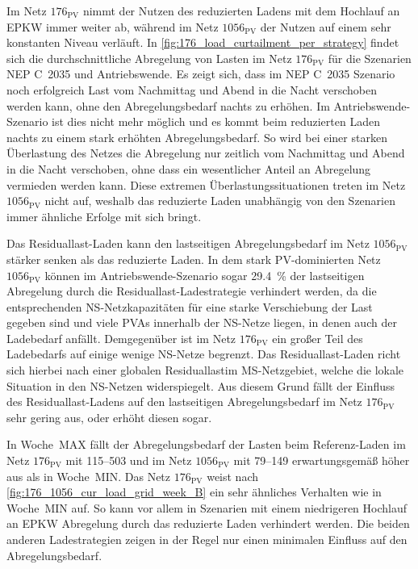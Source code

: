 

Im Netz \(176_{\text{PV}}\) nimmt der Nutzen des reduzierten Ladens mit dem Hochlauf an \gls{EPKW} immer weiter ab, während im Netz \(1056_{\text{PV}}\) der Nutzen auf einem sehr konstanten Niveau verläuft.
In \autoref{fig:176_load_curtailment_per_strategy} findet sich die durchschnittliche Abregelung von Lasten im Netz \(176_{\text{PV}}\) für die Szenarien \gls{NEP} C~\num{2035} und Antriebswende.
Es zeigt sich, dass im \gls{NEP} C~\num{2035} Szenario noch erfolgreich Last vom Nachmittag und Abend in die Nacht verschoben werden kann, ohne den Abregelungsbedarf nachts zu erhöhen.
Im Antriebswende-Szenario ist dies nicht mehr möglich und es kommt beim reduzierten Laden nachts zu einem stark erhöhten Abregelungsbedarf.
So wird bei einer starken Überlastung des Netzes die Abregelung nur zeitlich vom Nachmittag und Abend in die Nacht verschoben, ohne dass ein wesentlicher Anteil an Abregelung vermieden werden kann.
Diese extremen Überlastungssituationen treten im Netz \(1056_{\text{PV}}\) nicht auf, weshalb das reduzierte Laden unabhängig von den Szenarien immer ähnliche Erfolge mit sich bringt.



Das Residuallast-Laden kann den lastseitigen Abregelungsbedarf im Netz \(1056_{\text{PV}}\) stärker senken als das reduzierte Laden.
In dem stark \gls{PV}-dominierten Netz \(1056_{\text{PV}}\) können im Antriebswende-Szenario sogar \SI{29.4}{\percent} der lastseitigen Abregelung durch die Residuallast-Ladestrategie verhindert werden, da die entsprechenden \gls{NS}-Netzkapazitäten für eine starke Verschiebung der Last gegeben sind und viele \glspl{PVA} innerhalb der \gls{NS}-Netze liegen, in denen auch der Ladebedarf anfällt.
Demgegenüber ist im Netz \(176_{\text{PV}}\) ein großer Teil des Ladebedarfs auf einige wenige \gls{NS}-Netze begrenzt.
Das Residuallast-Laden richt sich hierbei nach einer globalen Residuallastim \gls{MS}-Netzgebiet, welche die lokale Situation in den \gls{NS}-Netzen widerspiegelt.
Aus diesem Grund fällt der Einfluss des Residuallast-Ladens auf den lastseitigen Abregelungsbedarf im Netz \(176_{\text{PV}}\) sehr gering aus, oder erhöht diesen sogar.\medskip

In Woche~MAX fällt der Abregelungsbedarf der Lasten beim Referenz-Laden im Netz \(176_{\text{PV}}\) mit \SIrange{115}{503}{\mwh} und im Netz \(1056_{\text{PV}}\) mit \SIrange{79}{149}{\mwh} erwartungsgemäß höher aus als in Woche~MIN.
Das Netz \(176_{\text{PV}}\) weist nach \autoref{fig:176_1056_cur_load_grid_week_B} ein sehr ähnliches Verhalten wie in Woche~MIN auf.
So kann vor allem in Szenarien mit einem niedrigeren Hochlauf an \gls{EPKW} Abregelung durch das reduzierte Laden verhindert werden.
Die beiden anderen Ladestrategien zeigen in der Regel nur einen minimalen Einfluss auf den Abregelungsbedarf.\medskip

